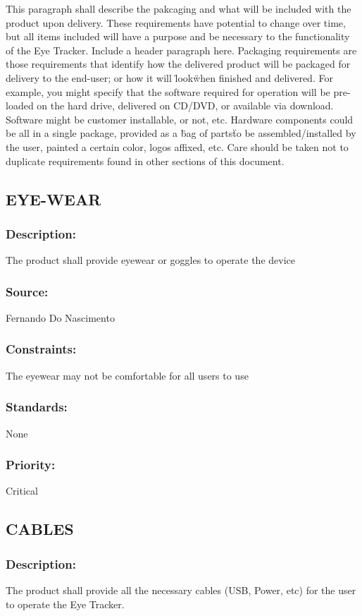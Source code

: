 This paragraph shall describe the pakcaging and what will be included with the product upon delivery. These requirements have potential to change over time, but all items included will have a purpose and be necessary to the functionality of the Eye Tracker.
Include a header paragraph here. Packaging requirements are those requirements that identify how the delivered product will be packaged for delivery to the end-user; or how it will \"look\" when finished and delivered. For example, you might specify that the software required for operation will be pre-loaded on the hard drive, delivered on CD/DVD, or available via download. Software might be customer installable, or not, etc. Hardware components could be all in a single package, provided as a \"bag of parts\" to be assembled/installed by the user, painted a certain color, logos affixed, etc. Care should be taken not to duplicate requirements found in other sections of this document.

\subsection{\text EYE-WEAR}
\subsubsection{Description:} 
	{The product shall provide eyewear or goggles to operate the device}
\subsubsection{Source:} 
	{Fernando Do Nascimento}
\subsubsection{Constraints:} 
	{The eyewear may not be comfortable for all users to use}
\subsubsection{Standards: }
{None}
\subsubsection{Priority:} {Critical}

\subsection{\text CABLES}
\subsubsection{Description: }
	{The product shall provide all the necessary cables (USB, Power, etc) for the user to operate the Eye Tracker.}
